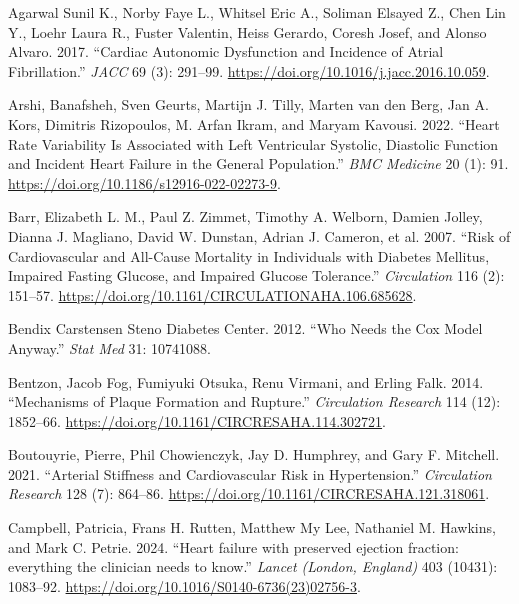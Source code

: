 \documentclass[
  a4paper,
  headsepline=true,
  open=any]{scrbook}
\newlength{\cslhangindent}
\newlength{\cslentryspacingunit} %
\newenvironment{CSLReferences}[2] %
 {%
  \setlength{\parindent}{0pt}
  \ifodd #1
  \let\oldpar\par
  \def\par{\hangindent=\cslhangindent\oldpar}
  \fi
  \setlength{\parskip}{#2\cslentryspacingunit}
 }%
 {}
\begin{document}
\hypertarget{refs}{}
\begin{CSLReferences}{1}{0}
\leavevmode{}%
Agarwal Sunil K., Norby Faye L., Whitsel Eric A., Soliman Elsayed Z.,
Chen Lin Y., Loehr Laura R., Fuster Valentin, Heiss Gerardo, Coresh
Josef, and Alonso Alvaro. 2017. {``Cardiac Autonomic Dysfunction and
Incidence of Atrial Fibrillation.''} \emph{JACC} 69 (3): 291--99.
\url{https://doi.org/10.1016/j.jacc.2016.10.059}.

\leavevmode{}%
Arshi, Banafsheh, Sven Geurts, Martijn J. Tilly, Marten van den Berg,
Jan A. Kors, Dimitris Rizopoulos, M. Arfan Ikram, and Maryam Kavousi.
2022. {``Heart Rate Variability Is Associated with Left Ventricular
Systolic, Diastolic Function and Incident Heart Failure in the General
Population.''} \emph{BMC Medicine} 20 (1): 91.
\url{https://doi.org/10.1186/s12916-022-02273-9}.

\leavevmode{}%
Barr, Elizabeth L. M., Paul Z. Zimmet, Timothy A. Welborn, Damien
Jolley, Dianna J. Magliano, David W. Dunstan, Adrian J. Cameron, et al.
2007. {``Risk of Cardiovascular and All-Cause Mortality in Individuals
with Diabetes Mellitus, Impaired Fasting Glucose, and Impaired Glucose
Tolerance.''} \emph{Circulation} 116 (2): 151--57.
\url{https://doi.org/10.1161/CIRCULATIONAHA.106.685628}.

\leavevmode{}%
Bendix Carstensen Steno Diabetes Center. 2012. {``Who Needs the Cox
Model Anyway.''} \emph{Stat Med} 31: 10741088.

\leavevmode{}%
Bentzon, Jacob Fog, Fumiyuki Otsuka, Renu Virmani, and Erling Falk.
2014. {``Mechanisms of Plaque Formation and Rupture.''}
\emph{Circulation Research} 114 (12): 1852--66.
\url{https://doi.org/10.1161/CIRCRESAHA.114.302721}.

\leavevmode{}%
Boutouyrie, Pierre, Phil Chowienczyk, Jay D. Humphrey, and Gary F.
Mitchell. 2021. {``Arterial Stiffness and Cardiovascular Risk in
Hypertension.''} \emph{Circulation Research} 128 (7): 864--86.
\url{https://doi.org/10.1161/CIRCRESAHA.121.318061}.

\leavevmode{}%
Campbell, Patricia, Frans H. Rutten, Matthew My Lee, Nathaniel M.
Hawkins, and Mark C. Petrie. 2024. {``Heart failure with preserved
ejection fraction: everything the clinician needs to know.''}
\emph{Lancet (London, England)} 403 (10431): 1083--92.
\url{https://doi.org/10.1016/S0140-6736(23)02756-3}.


\end{CSLReferences}
\end{document}
